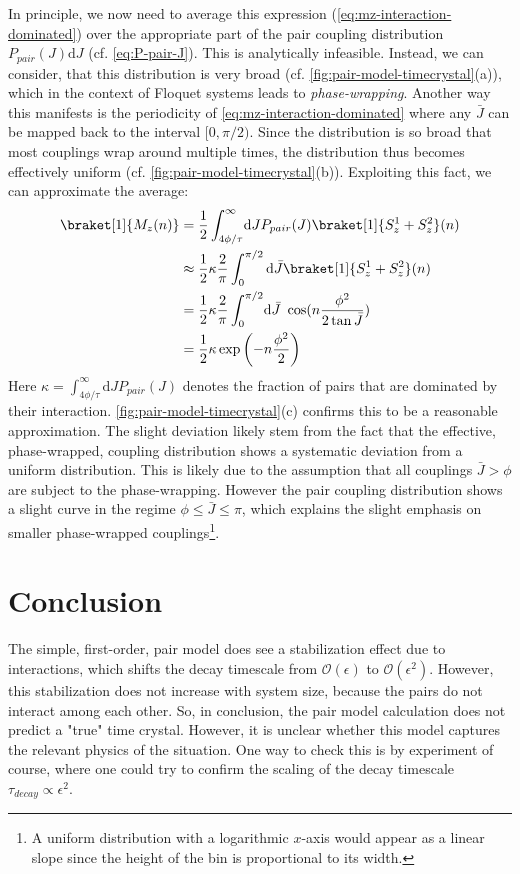 In principle, we now need to average this expression (\autoref{eq:mz-interaction-dominated}) over the appropriate part of the pair coupling distribution $P_{pair}(J)\mathrm{d}J$ (cf. \autoref{eq:P-pair-J}). This is analytically infeasible. Instead, we can consider, that this distribution is very broad (cf. \autoref{fig:pair-model-timecrystal}(a)), which in the context of Floquet systems leads to \emph{phase-wrapping}. Another way this manifests is the periodicity of \autoref{eq:mz-interaction-dominated} where any $\bar{J}$ can be mapped back to the interval $[0,\pi/2)$. Since the distribution is so broad that most couplings wrap around multiple times, the distribution thus becomes effectively uniform (cf. \autoref{fig:pair-model-timecrystal}(b)). Exploiting this fact, we can approximate the average:
\begin{align}
	\braket[1]{M_z(n)} &= \frac{1}{2}\int_{4\phi/\tau}^\infty\!\mathrm{d}J P_{pair}(J) \braket[1]{S_z^1+S_z^2}(n) \\
	&\approx \frac{1}{2} \kappa \frac{2}{\pi}\int_{0}^{\pi/2} \mathrm{d}\bar{J} \braket[1]{S_z^1+S_z^2}(n) \\
	&= \frac{1}{2} \kappa \frac{2}{\pi}\int_0^{\pi/2}\!\mathrm{d}\bar{J}\ \cos(n\frac{\phi^2}{2\tan\bar{J}})\\
	&= \frac{1}{2} \kappa \exp\left(-n\frac{\phi^2}2\right)
\end{align}
Here $\kappa=\int_{4\phi/\tau}^{\infty}\!\mathrm{d}JP_{pair}(J)$ denotes the fraction of pairs that are dominated by their interaction. \autoref{fig:pair-model-timecrystal}(c) confirms this to be a reasonable approximation. The slight deviation likely stem from the fact that the effective, phase-wrapped, coupling distribution shows a systematic deviation from a uniform distribution. This is likely due to the assumption that all couplings $\bar{J}>\phi$ are subject to the phase-wrapping. However the pair coupling distribution shows a slight curve in the regime $\phi\leq\bar{J}\leq\pi$, which explains the slight emphasis on smaller phase-wrapped couplings\footnote{A uniform distribution with a logarithmic $x$-axis would appear as a linear slope since the height of the bin is proportional to its width.}.

\section{Conclusion}
The simple, first-order, pair model does see a stabilization effect due to interactions, which shifts the decay timescale from $\mathcal{O}(\epsilon)$ to $\mathcal{O}(\epsilon^2)$. However, this stabilization does not increase with system size, because the pairs do not interact among each other. So, in conclusion, the pair model calculation does not predict a "true" time crystal. However, it is unclear whether this  model captures the relevant physics of the situation. One way to check this is by experiment of course, where one could try to confirm the scaling of the decay timescale $\tau_{decay}\propto\epsilon^2$.

